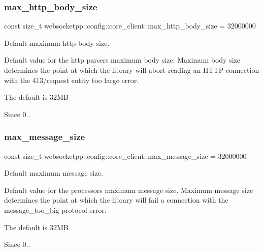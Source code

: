 \subsubsection{\texorpdfstring{max\+\_\+http\+\_\+body\+\_\+size}{max\_http\_body\_size}}
{\footnotesize\ttfamily const size\+\_\+t websocketpp\+::config\+::core\+\_\+client\+::max\+\_\+http\+\_\+body\+\_\+size = 32000000\hspace{0.3cm}{\ttfamily [static]}}



Default maximum http body size. 

Default value for the http parser\textquotesingle{}s maximum body size. Maximum body size determines the point at which the library will abort reading an H\+T\+TP connection with the 413/request entity too large error.

The default is 32\+MB

\begin{DoxySince}{Since}
0.. 
\end{DoxySince}
\mbox{\label{structwebsocketpp_1_1config_1_1core__client_a84c86d78867a89e10d24866deb931807}} 
\subsubsection{\texorpdfstring{max\+\_\+message\+\_\+size}{max\_message\_size}}
{\footnotesize\ttfamily const size\+\_\+t websocketpp\+::config\+::core\+\_\+client\+::max\+\_\+message\+\_\+size = 32000000\hspace{0.3cm}{\ttfamily [static]}}



Default maximum message size. 

Default value for the processor\textquotesingle{}s maximum message size. Maximum message size determines the point at which the library will fail a connection with the message\+\_\+too\+\_\+big protocol error.

The default is 32\+MB

\begin{DoxySince}{Since}
0.. 
\end{DoxySince}
\mbox{\label{structwebsocketpp_1_1config_1_1core__client_affc0279e7717d68fbe5d2bb874f8d4d1}} 
